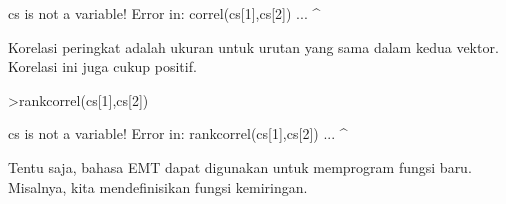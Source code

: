 \documentclass[a4paper,10pt]{article}
\begin{document}
\begin{eulernotebook}
\begin{eulerprompt}
\end{eulerprompt}
\begin{euleroutput}
  cs is not a variable!
  Error in:
  correl(cs[1],cs[2]) ...
              ^
\end{euleroutput}
\begin{eulercomment}
Korelasi peringkat adalah ukuran untuk urutan yang sama dalam kedua
vektor. Korelasi ini juga cukup positif.
\end{eulercomment}
\begin{eulerprompt}
>rankcorrel(cs[1],cs[2])
\end{eulerprompt}
\begin{euleroutput}
  cs is not a variable!
  Error in:
  rankcorrel(cs[1],cs[2]) ...
                  ^
\end{euleroutput}
\begin{eulercomment}
Tentu saja, bahasa EMT dapat digunakan untuk memprogram fungsi baru.
Misalnya, kita mendefinisikan fungsi kemiringan.


\end{eulercomment}
\end{eulernotebook}
\end{document}
